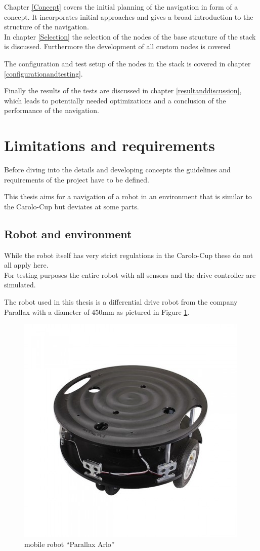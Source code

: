 Chapter \ref{Concept} covers the initial planning of the navigation in form of a concept. It incorporates initial approaches and gives a broad introduction to the structure of the navigation.\\

In chapter \ref{Selection} the selection of the nodes of the base structure of the stack is discussed. Furthermore the development of all custom nodes is covered

The configuration and test setup of the nodes in the stack is covered in chapter \ref{configurationandtesting}.


Finally the results of the tests are discussed in chapter \ref{resultanddiscussion}, which leads to potentially needed optimizations and a conclusion of the performance of the navigation.

\section{Limitations and requirements}

Before diving into the details and developing concepts the guidelines and requirements of the project have to be defined.

This thesis aims for a navigation of a robot in an environment that is similar to the Carolo-Cup but deviates at some parts.

\subsection{Robot and environment}
While the robot itself has very strict regulations in the Carolo-Cup these do not all apply here.\\

For testing purposes the entire robot with all sensors and the drive controller are simulated.

The robot used in this thesis is a differential drive robot from the company Parallax with a diameter of 450mm as pictured in Figure \ref{arlore}.\\

\begin{figure}[H]
	\centering
	\includegraphics[width=.7\textwidth]{arlo real}
	
	\caption{mobile robot ``Parallax Arlo'' \cite{arloreal}}
	\label{arlore}
\end{figure}


